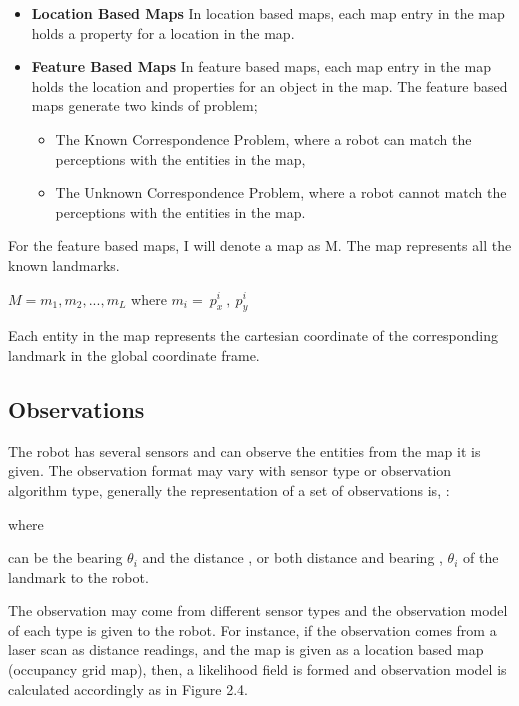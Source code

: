\begin{itemize}
  \item \textbf{Location Based Maps}
  In location based maps, each map entry in the map holds a property for a location in the map.
  \item \textbf{Feature Based Maps}
  In feature based maps, each map entry in the map holds the location and properties for an object in the map. The feature based maps generate two kinds of problem;
  \begin{itemize}
    \item The Known Correspondence Problem, where a robot can match the perceptions with the entities in the map,
    \item The Unknown Correspondence Problem, where a robot cannot match the perceptions with the entities in the map.
  \end{itemize}
\end{itemize}

For the feature based maps, I will denote a map as M. The map represents all the known landmarks.

$M = m_{1}, m_{2}, ..., m_{L}$ where 
$m_{i} = \ p_x^i\ , \ p_y^i\ $

Each entity  in the map represents the cartesian coordinate of the corresponding landmark in the global coordinate frame.

\subsection{Observations}
The robot has several sensors and can observe the entities from the map it is given. The observation format may vary with sensor type or observation algorithm type, generally the representation of a set of observations is, :

 where

 can be the bearing $ \theta_{i}$ and the distance  , or both distance and bearing  , 
$ \theta_{i}$  of the landmark to the robot.



The observation may come from different sensor types and the observation model  of each type is given to the robot. For instance, if the observation comes from a laser scan as distance readings, and the map is given as a location based map (occupancy grid map), then, a likelihood field is formed and observation model is calculated accordingly as in Figure 2.4.

